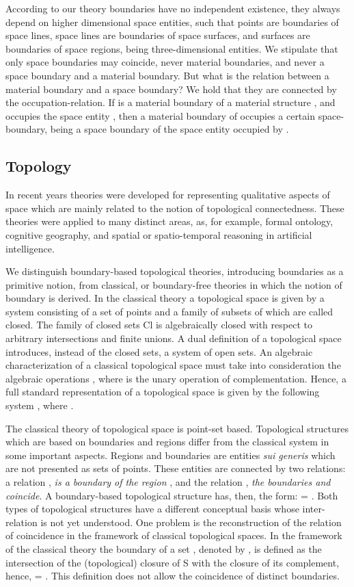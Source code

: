 \documentclass{ao2e}
\begin{document}
{ According to our theory boundaries have no independent existence, they always depend on higher dimensional space entities, such that points are boundaries of space lines, space lines are boundaries of space surfaces, and surfaces are boundaries of space regions, being three-dimensional entities. We stipulate that only space boundaries may coincide, never material boundaries, and never a space boundary and a material boundary. But what is the relation between a material boundary and a space boundary? We hold that they are connected by the occupation-relation. If  is a material boundary of a material structure , and  occupies the space entity , then a material boundary of  occupies a certain space-boundary, being a space boundary of the space entity occupied by .

\subsection{Topology}
In recent years theories were developed for representing qualitative aspects of space which are mainly related
to the notion of topological connectedness. These theories were applied
to many distinct areas, as, for example, formal ontology, cognitive geography, and
spatial or spatio-temporal reasoning in artificial intelligence.
 
We distinguish boundary-based topological theories, introducing boundaries as a primitive notion, from classical, or boundary-free theories in which the notion of boundary is derived. In the classical theory a topological space is given by a system  consisting of a set  of points and a family  of subsets
of which are called closed. The family of closed sets Cl is algebraically closed with respect to arbitrary intersections and finite unions. A dual definition of a topological space introduces, instead of the closed sets, a system of open sets.
An algebraic characterization of a classical topological space must take into consideration the algebraic
operations  , where  is the unary operation of complementation. Hence, a full standard
representation of a topological space is given by the following system 
, where .

The classical theory of
topological space is point-set based. Topological structures which are based on boundaries and regions differ from the classical system in some important aspects. Regions and boundaries are entities {\it sui generis} which are not presented as sets of points. These entities are connected by two relations: a relation ,  \textit{is a boundary of the region} , and the relation , {\it the boundaries  and  coincide}. A boundary-based topological structure has, then, the form:  = .
Both types of topological structures have a different conceptual basis whose inter-relation is not yet understood. One problem is the reconstruction of the
relation of coincidence in the framework of classical topological spaces. In the framework of the classical theory
the boundary of a set , denoted by , is defined as the intersection of the (topological) closure of S with the closure of its complement, hence, =   . This definition does not allow the coincidence of distinct boundaries.

}
\end{document}
